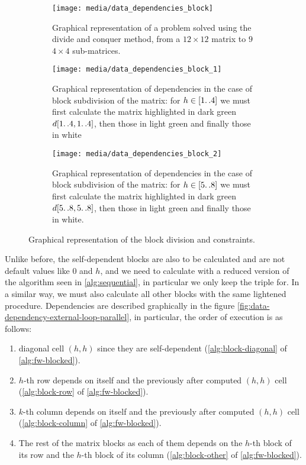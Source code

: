 \begin{figure}[htbp]
    \centering
    \begin{subfigure}[t]{0.3\textwidth}
        \texttt{[image: media/data\_dependencies\_block]}
        \caption{Graphical representation of a problem solved using the divide and conquer method, from a \(12\times 12\) matrix to \(9\) \(4\times 4\) sub-matrices.}
        \label{fig:submatrix}
    \end{subfigure}
    \hfill
    \begin{subfigure}[t]{0.3\textwidth}
        \texttt{[image: media/data\_dependencies\_block\_1]}
        \caption{Graphical representation of dependencies in the case of block subdivision of the matrix: for \(h \in [1{\mathinner {\ldotp \ldotp}}4]\) we must first calculate the matrix highlighted in dark green \(d[1{\mathinner {\ldotp \ldotp}}4,1{\mathinner {\ldotp \ldotp}}4]\), then those in light green and finally those in white}
        \label{fig:data-dependencies-block-1}
    \end{subfigure}
    \hfill
    \begin{subfigure}[t]{0.3\textwidth}
        \texttt{[image: media/data\_dependencies\_block\_2]}
        \caption{Graphical representation of dependencies in the case of block subdivision of the matrix: for \(h \in [5{\mathinner {\ldotp \ldotp}}8]\) we must first calculate the matrix highlighted in dark green \(d[5{\mathinner {\ldotp \ldotp}}8,5{\mathinner {\ldotp \ldotp}}8]\), then those in light green and finally those in white.}
        \label{fig:data-dependencies-block-2}
    \end{subfigure}
    \caption{Graphical representation of the block division and constraints.}
    \label{fig:data-representation-of-the-block-division-and-constraints}
\end{figure}
Unlike before, the self-dependent blocks are also to be calculated and are not default values like \(0\) and \(h\), and we need to calculate with a reduced version of the algorithm seen in \cref{alg:sequential}, in particular we only keep the triple for. In a similar way, we must also calculate all other blocks with the same lightened procedure. Dependencies are described graphically in the figure \cref{fig:data-dependency-external-loop-parallel}, in particular, the order of execution is as follows:
\begin{enumerate}
    \item diagonal cell \((h,h)\) since they are self-dependent (\cref{alg:block-diagonal} of \cref{alg:fw-blocked}).
    \item \(h\)-th row depends on itself and the previously after computed  \((h,h)\) cell (\cref{alg:block-row}  of \cref{alg:fw-blocked}).
    \item \(k\)-th column depends on itself and the previously after computed  \((h,h)\) cell (\cref{alg:block-column}  of \cref{alg:fw-blocked}).
    \item The rest of the matrix blocks as each of them depends on the \(h\)-th block of its row and the \(h\)-th block of its column (\cref{alg:block-other}  of \cref{alg:fw-blocked}).
\end{enumerate}


